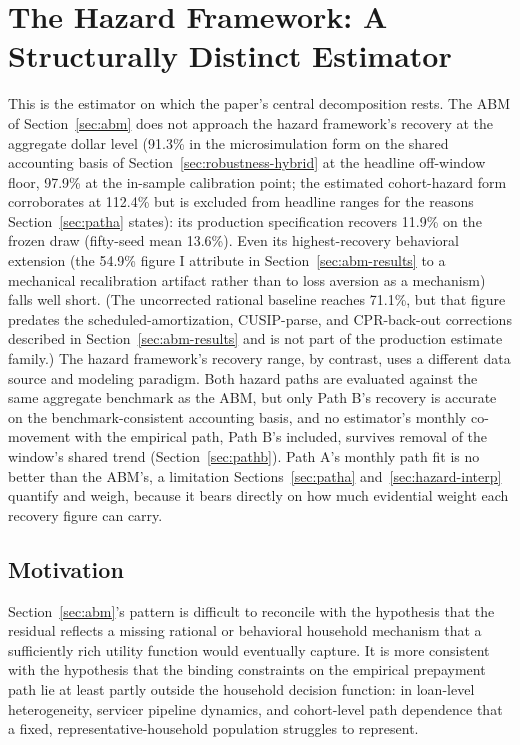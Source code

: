 \documentclass[12pt]{article}
\begin{document}
\section{The Hazard Framework: A Structurally Distinct Estimator}\label{sec:hazard}

This is the estimator on which the paper's central decomposition rests. The ABM of Section~\ref{sec:abm} does not approach the hazard framework's recovery at the aggregate dollar level (91.3\% in the microsimulation form on the shared accounting basis of Section~\ref{sec:robustness-hybrid} at the headline off-window floor, 97.9\% at the in-sample calibration point; the estimated cohort-hazard form corroborates at 112.4\% but is excluded from headline ranges for the reasons Section~\ref{sec:patha} states): its production specification recovers 11.9\% on the frozen draw (fifty-seed mean 13.6\%). Even its highest-recovery behavioral extension (the 54.9\% figure I attribute in Section~\ref{sec:abm-results} to a mechanical recalibration artifact rather than to loss aversion as a mechanism) falls well short. (The uncorrected rational baseline reaches 71.1\%, but that figure predates the scheduled-amortization, CUSIP-parse, and CPR-back-out corrections described in Section~\ref{sec:abm-results} and is not part of the production estimate family.) The hazard framework's recovery range, by contrast, uses a different data source and modeling paradigm. Both hazard paths are evaluated against the same aggregate benchmark as the ABM, but only Path B's recovery is accurate on the benchmark-consistent accounting basis, and no estimator's monthly co-movement with the empirical path, Path B's included, survives removal of the window's shared trend (Section~\ref{sec:pathb}). Path A's monthly path fit is no better than the ABM's, a limitation Sections~\ref{sec:patha} and~\ref{sec:hazard-interp} quantify and weigh, because it bears directly on how much evidential weight each recovery figure can carry.

\subsection{Motivation}\label{sec:hazard-motivation}

Section~\ref{sec:abm}'s pattern is difficult to reconcile with the hypothesis that the residual reflects a missing rational or behavioral household mechanism that a sufficiently rich utility function would eventually capture. It is more consistent with the hypothesis that the binding constraints on the empirical prepayment path lie at least partly outside the household decision function: in loan-level heterogeneity, servicer pipeline dynamics, and cohort-level path dependence that a fixed, representative-household population struggles to represent.
\end{document}

